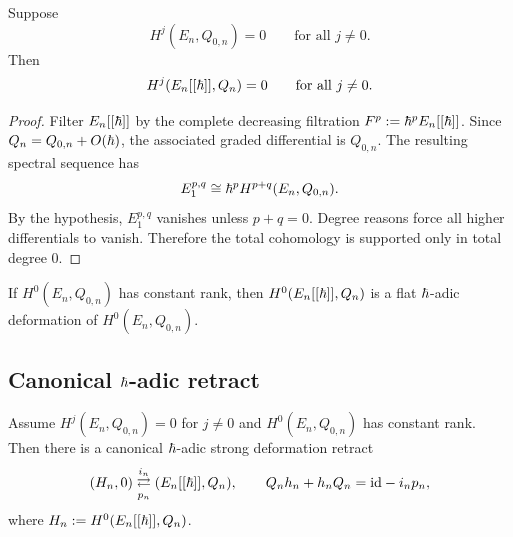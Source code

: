 \begin{theorem}%
Suppose
\[
 H^j(E_n,Q_{0,n})=0 \qquad \text{for all } j\neq 0.
\]
Then
\[
 H^j(E_n[[\hbar]],Q_n)=0 \qquad \text{for all } j\neq 0.
\]
\end{theorem}

\begin{proof}
Filter $E_n[[\hbar]]$ by the complete decreasing filtration $F^p:=\hbar^pE_n[[\hbar]]$. Since $Q_n=Q_{0,n}+O(\hbar)$, the associated graded differential is $Q_{0,n}$. The resulting spectral sequence has
\[
 E_1^{p,q}\cong \hbar^p H^{p+q}(E_n,Q_{0,n}).
\]
By the hypothesis, $E_1^{p,q}$ vanishes unless $p+q=0$. Degree reasons force all higher differentials to vanish. Therefore the total cohomology is supported only in total degree $0$.
\end{proof}

\begin{corollary}%
If $H^0(E_n,Q_{0,n})$ has constant rank, then $H^0(E_n[[\hbar]],Q_n)$ is a flat $\hbar$-adic deformation of $H^0(E_n,Q_{0,n})$.
\end{corollary}

\subsection{Canonical $\hbar$-adic retract}

\begin{theorem}%
Assume $H^j(E_n,Q_{0,n})=0$ for $j\neq 0$ and $H^0(E_n,Q_{0,n})$ has constant rank. Then there is a canonical $\hbar$-adic strong deformation retract
\[
 (H_n,0) \underset{p_n}{\stackrel{i_n}{\rightleftarrows}} (E_n[[\hbar]],Q_n),
 \qquad
 Q_n h_n+h_nQ_n = \mathrm{id} - i_np_n,
\]
where $H_n:=H^0(E_n[[\hbar]],Q_n)$.
\end{theorem}

